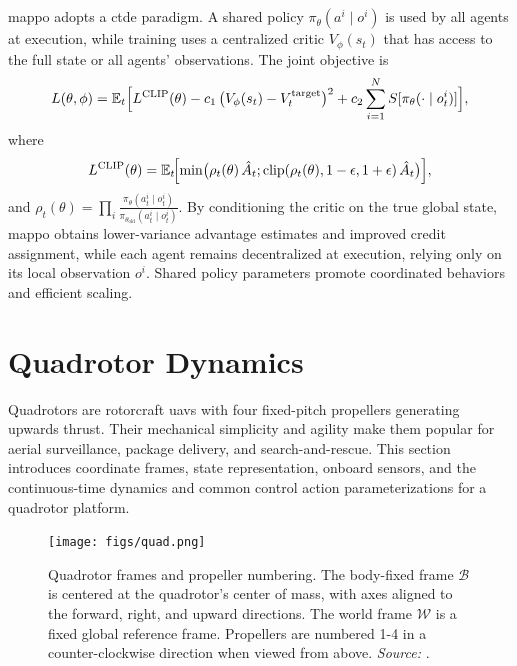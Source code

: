 \subsection{}
\gls{mappo} \cite{yu_surprising_2022} adopts a \gls{ctde} paradigm. A shared policy \(\pi_\theta(a^i\mid o^i)\) is used by all agents at execution, while training uses a centralized critic \(V_\phi(s_t)\) that has access to the full state or all agents' observations. The joint objective is
\begin{equation}
L(\theta,\phi) = \mathbb{E}_t\Bigl[L^{\mathrm{CLIP}}(\theta)
  - c_1\,\bigl(V_\phi(s_t)-V^{\text{target}}_t\bigr)^2
  + c_2 \sum_{i=1}^N S[\pi_\theta(\cdot\mid o^i_t)]\Bigr],
\end{equation}
where 
\begin{equation}
L^{\mathrm{CLIP}}(\theta) = \mathbb{E}_t\!\Bigl[\min\bigl(\rho_t(\theta)\,\hat{A}_t;\text{clip}(\rho_t(\theta),1-\epsilon,1+\epsilon)\,\hat{A}_t\bigr)\Bigr],
\end{equation}
and \(\rho_t(\theta)=\prod_i \frac{\pi_\theta(a^i_t\mid o^i_t)}{\pi_{\theta_{\text{old}}}(a^i_t\mid o^i_t)}\). By conditioning the critic on the true global state, \gls{mappo} obtains lower-variance advantage estimates and improved credit assignment, while each agent remains decentralized at execution, relying only on its local observation \(o^i\). Shared policy parameters promote coordinated behaviors and efficient scaling.

\section{Quadrotor Dynamics}
\label{sec:quadrotor_control}
Quadrotors are rotorcraft \glspl{uav} with four fixed-pitch propellers generating upwards thrust. Their mechanical simplicity and agility make them popular for aerial surveillance, package delivery, and search-and-rescue. This section introduces coordinate frames, state representation, onboard sensors, and the continuous-time dynamics and common control action parameterizations for a quadrotor platform.
\begin{figure}[t]
  \centering
  \texttt{[image: figs/quad.png]}
  \caption[Quadrotor fundamentals]{%
    Quadrotor frames and propeller numbering. The body-fixed frame \(\mathcal{B}\) is centered at the quadrotor's center of mass, with axes aligned to the forward, right, and upward directions. The world frame \(\mathcal{W}\) is a fixed global reference frame. Propellers are numbered 1-4 in a counter-clockwise direction when viewed from above. \textit{Source:} \cite{kaufmann_benchmark_2022}.
  }
  \label{fig:quadrotor_frames}
\end{figure}


